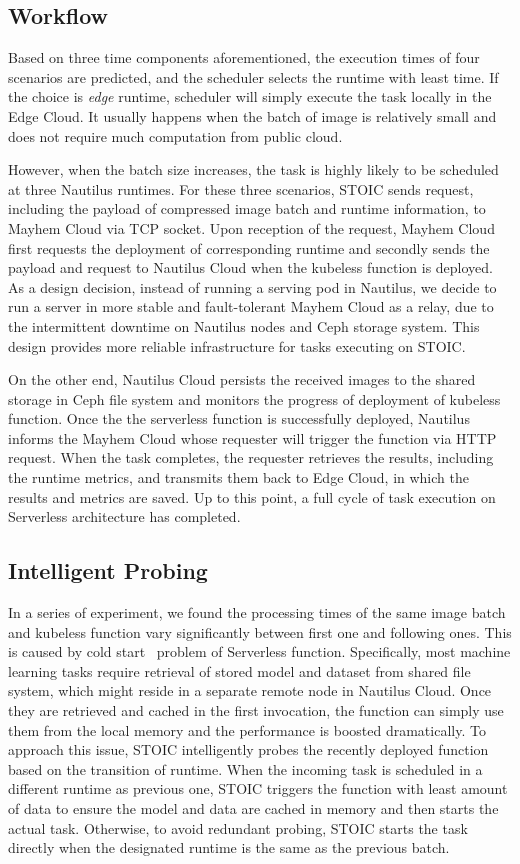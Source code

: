  
 \subsection{Workflow}
 Based on three time components aforementioned, the execution times of four scenarios are predicted, and the scheduler selects the runtime with least time. If the choice is \textit{edge} runtime, scheduler will simply execute the task locally in the Edge Cloud. It usually happens when the batch of image is relatively small and does not require much computation from public cloud.
 
 However, when the batch size increases, the task is highly likely to be scheduled at three Nautilus runtimes. For these three scenarios, STOIC sends request, including the payload of compressed image batch and runtime information, to Mayhem Cloud via TCP socket. Upon reception of the request, Mayhem Cloud first requests the deployment of corresponding runtime and secondly sends the payload and request to Nautilus Cloud when the kubeless function is deployed. As a design decision, instead of running a serving pod in Nautilus, we decide to run a server in more stable and fault-tolerant Mayhem Cloud as a relay, due to the intermittent downtime on Nautilus nodes and Ceph storage system. This design provides more reliable infrastructure for tasks executing on STOIC.
 
 On the other end, Nautilus Cloud persists the received images to the shared storage in Ceph file system and monitors the progress of deployment of kubeless function. Once the the serverless function is successfully deployed, Nautilus informs the Mayhem Cloud whose requester will trigger the function via HTTP request. When the task completes, the requester retrieves the results, including the runtime metrics, and transmits them back to Edge Cloud, in which the results and metrics are saved. Up to this point, a full cycle of task execution on Serverless architecture has completed.
 
 \subsection{Intelligent Probing}
 In a series of experiment, we found the processing times of the same image batch and kubeless function vary significantly between first one and following ones. This is caused by cold start~\cite{ref:coldstart} problem of Serverless function. Specifically, most machine learning tasks require retrieval of stored model and dataset from shared file system, which might reside in a separate remote node in Nautilus Cloud. Once they are retrieved and cached in the first invocation, the function can simply use them from the local memory and the performance is boosted dramatically. To approach this issue, STOIC intelligently probes the recently deployed function based on the transition of runtime. When the incoming task is scheduled in a different runtime as previous one, STOIC triggers the function with least amount of data to ensure the model and data are cached in memory and then starts the actual task. Otherwise, to avoid redundant probing, STOIC starts the task directly when the designated runtime is the same as the previous batch. 